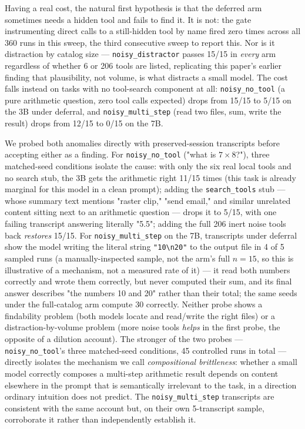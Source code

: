 \documentclass[smallcondensed,natbib]{svjour3}
\begin{document}
Having a real cost, the natural first hypothesis is that the deferred
arm sometimes needs a hidden tool and fails to find it. It is not: the
gate instrumenting direct calls to a still-hidden tool by name fired
zero times across all 360 runs in this sweep, the third consecutive
sweep to report this. Nor is it distraction by catalog size ---
\texttt{noisy\_distractor} passes 15/15 in \emph{every} arm regardless
of whether 6 or 206 tools are listed, replicating this paper's earlier
finding that plausibility, not volume, is what distracts a small model.
The cost falls instead on tasks with no tool-search component at all:
\texttt{noisy\_no\_tool} (a pure arithmetic question, zero tool calls
expected) drops from 15/15 to 5/15 on the 3B under deferral, and
\texttt{noisy\_multi\_step} (read two files, sum, write the result)
drops from 12/15 to 0/15 on the 7B.

We probed both anomalies directly with preserved-session transcripts
before accepting either as a finding. For \texttt{noisy\_no\_tool}
("what is $7\times8$?"), three matched-seed conditions isolate the
cause: with only the six real local tools and no search stub, the 3B
gets the arithmetic right 11/15 times (this task is already marginal
for this model in a clean prompt); adding the \texttt{search\_tools}
stub --- whose summary text mentions "raster clip," "send email," and
similar unrelated content sitting next to an arithmetic question ---
drops it to 5/15, with one failing transcript answering literally
"5.5"; adding the full 206 inert noise tools back \emph{restores} 15/15.
For \texttt{noisy\_multi\_step} on the 7B, transcripts under deferral
show the model writing the literal string \texttt{"10\textbackslash n20"}
to the output file in 4 of 5 sampled runs (a manually-inspected sample,
not the arm's full $n{=}15$, so this is illustrative of a mechanism, not
a measured rate of it) --- it read both numbers correctly and wrote them
correctly, but never computed their sum, and its final answer describes
"the numbers 10 and 20" rather than their total; the same seeds under
the full-catalog arm compute 30 correctly. Neither probe shows a
findability problem (both models locate and read/write the right files)
or a distraction-by-volume problem (more noise tools \emph{helps} in the
first probe, the opposite of a dilution account). The stronger of the
two probes --- \texttt{noisy\_no\_tool}'s three matched-seed conditions,
45 controlled runs in total --- directly isolates the mechanism we call
\emph{compositional brittleness}: whether a small model correctly
composes a multi-step arithmetic result depends on content elsewhere in
the prompt that is semantically irrelevant to the task, in a direction
ordinary intuition does not predict. The \texttt{noisy\_multi\_step}
transcripts are consistent with the same account but, on their own
5-transcript sample, corroborate it rather than independently
establish it.
\end{document}
